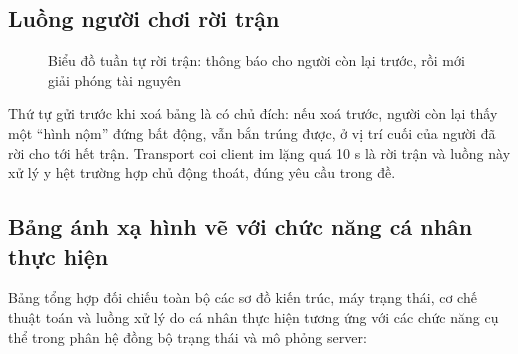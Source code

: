 \subsection{Luồng người chơi rời trận}
\begin{figure}[H]
\centering
\renewcommand{\seqstep}{0.64cm}
\caption{Biểu đồ tuần tự rời trận: thông báo cho người còn lại trước, rồi mới giải phóng tài nguyên}
\label{fig:C-luong-roi}
\end{figure}
Thứ tự gửi  trước khi xoá bảng là có chủ đích: nếu xoá trước, người còn lại thấy một ``hình nộm''
đứng bất động, vẫn bắn trúng được, ở vị trí cuối của người đã rời cho tới hết trận. Transport coi client im lặng quá
10 s là rời trận và luồng này xử lý y hệt trường hợp chủ động thoát, đúng yêu cầu trong đề.

\subsection{Bảng ánh xạ hình vẽ với chức năng cá nhân thực hiện}
\label{sec:C-mapping-hinh-ve}
Bảng tổng hợp đối chiếu toàn bộ các sơ đồ kiến trúc, máy trạng thái, cơ chế thuật toán và luồng xử lý do cá nhân thực hiện tương ứng với các chức năng cụ thể trong phân hệ đồng bộ trạng thái và mô phỏng server:

